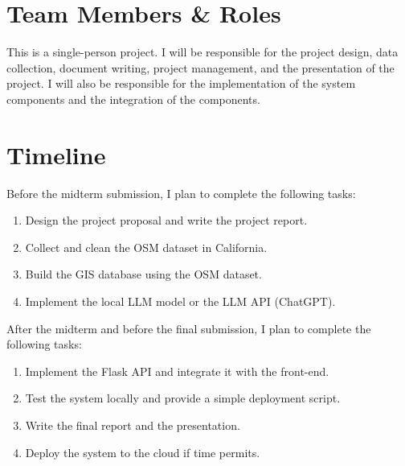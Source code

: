 \documentclass{article}
\begin{document}
\section{Team Members \& Roles}

This is a single-person project. I will be responsible for the project design, data collection, document writing, project management, and the presentation of the project. I will also be responsible for the implementation of the system components and the integration of the components.

\section{Timeline}

Before the midterm submission, I plan to complete the following tasks:

\begin{enumerate}
    \item Design the project proposal and write the project report.
    \item Collect and clean the OSM dataset in California.
    \item Build the GIS database using the OSM dataset.
    \item Implement the local LLM model or the LLM API (ChatGPT).
\end{enumerate}
After the midterm and before the final submission, I plan to complete the following tasks:

\begin{enumerate}
    \item Implement the Flask API and integrate it with the front-end.
    \item Test the system locally and provide a simple deployment script.
    \item Write the final report and the presentation.
    \item Deploy the system to the cloud if time permits.
\end{enumerate}

\end{document}
